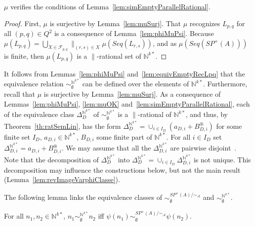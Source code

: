 \documentclass{CSML}
\begin{document}
\begin{lem}
  \label{lem:muOK}
  $\mu$ verifies the conditions of Lemma~\ref{lem:simEmptyParallelRational}.
\end{lem}

\begin{proof}
  First, $\mu$ is surjective by Lemma~\ref{lem:muSurj}.
  That $\mu$ recognizes $L_{p,q}$ for all $(p,q)\in Q^2$ is a consequence of Lemma~\ref{lem:phiMuPsi}.
  Because $\mu(L_{p,q})=\mathop\bigcup_{X\in \mathcal{F}_{p,q}}\mathop\parallel_{(r,s)\in X} \mu(Seq(L_{r,s}))$, and as $\mu(Seq(SP^+(A)))$ is finite, then $\mu(L_{p,q})$ is a $\parallel$-rational set of $\mathbb{N}^{k*}$.
\end{proof}

It follows from Lemmas~\ref{lem:phiMuPsi} and~\ref{lem:equivEmptyRecLpq} that the equivalence relation $\sim_\emptyset^{\mathbb{N}^{k*}}$ can be defined over the elements of $\mathbb{N}^{k*}$.
Furthermore, recall that $\mu$ is surjective by Lemma~\ref{lem:muSurj}.
As a consequence of Lemmas~\ref{lem:phiMuPsi}, \ref{lem:muOK} and~\ref{lem:simEmptyParallelRational}, each of the equivalence class $\Delta_D^{\mathbb{N}^{k*}}$ of $\sim_\emptyset^{\mathbb{N}^{k*}}$ is a $\parallel$-rational of $\mathbb{N}^{k*}$, and thus, by Theorem~\ref{th:ratSemLin}, has the form $\Delta_D^{\mathbb{N}^{k*}}=\cup_{i\in I_D}(a_{D,i}+ B_{D,i}^\circledast)$ for some finite set $I_D$, $a_{D,i}\in\mathbb{N}^{k*}$, $B_{D,i}$ some finite part of $\mathbb{N}^{k*}$. For all $i\in I_D$ set $\Delta_{D,i}^{\mathbb{N}^{k*}}=a_{D,i}+ B_{D,i}^\circledast$. We may assume that all the $\Delta_{D,i}^{\mathbb{N}^{k*}}$ are pairwise disjoint~\cite[Theorem~IV]{EilSch69}. Note that the decomposition of $\Delta_D^{\mathbb{N}^{k*}}$ into $\Delta_D^{\mathbb{N}^{k*}}=\cup_{i\in I_D}\Delta_{D,i}^{\mathbb{N}^{k*}}$ is not unique. This decomposition may influence the constructions below, but not the main result (Lemma~\ref{lem:revImageVarphiClasse}).

The following lemma links the equivalence classes of $\sim_\emptyset^{SP^+(A)/\mathord\sim_\mathcal{A}}$ and $\sim_\emptyset^{\mathbb{N}^{k*}}$.
\begin{lem}
  For all $n_1,n_2\in\mathbb{N}^{k*}$, $n_1\sim_\emptyset^{\mathbb{N}^{k*}} n_2$ iff $\psi(n_1)\sim_\emptyset^{SP^+(A)/\mathord\sim_\mathcal{A}} \psi(n_2)$.
\end{lem}
\end{document}
